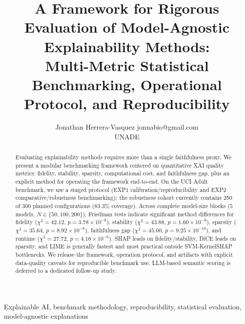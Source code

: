 \documentclass[twoside,11pt]{article}
\begin{document}
\title{A Framework for Rigorous Evaluation of Model-Agnostic Explainability Methods:\\
Multi-Metric Statistical Benchmarking, Operational Protocol, and Reproducibility}

\author{
\name Jonathan Herrera-Vasquez \email jonnabio@gmail.com \\
\addr UNADE
}


\maketitle

\begin{abstract}
Evaluating explainability methods requires more than a single faithfulness proxy. We present a modular benchmarking framework centered on quantitative XAI quality metrics: fidelity, stability, sparsity, computational cost, and faithfulness gap, plus an explicit method for operating the framework end-to-end. On the UCI Adult benchmark, we use a staged protocol (EXP1 calibration/reproducibility and EXP2 comparative/robustness benchmarking); the robustness cohort currently contains 250 of 300 planned configurations (83.3\% coverage). Across complete model-size blocks ($5$ models, $N \in \{50,100,200\}$), Friedman tests indicate significant method differences for fidelity ($\chi^2=42.12$, $p=3.78\times10^{-9}$), stability ($\chi^2=43.88$, $p=1.60\times10^{-9}$), sparsity ($\chi^2=35.64$, $p=8.92\times10^{-8}$), faithfulness gap ($\chi^2=45.00$, $p=9.25\times10^{-10}$), and runtime ($\chi^2=27.72$, $p=4.16\times10^{-6}$). SHAP leads on fidelity/stability, DiCE leads on sparsity, and LIME is generally fastest and most practical outside SVM-KernelSHAP bottlenecks. We release the framework, operation protocol, and artifacts with explicit data-quality caveats for reproducible benchmark use. LLM-based semantic scoring is deferred to a dedicated follow-up study.
\end{abstract}

\begin{keywords}
Explainable AI, benchmark methodology, reproducibility, statistical evaluation, model-agnostic explanations
\end{keywords}
\end{document}
